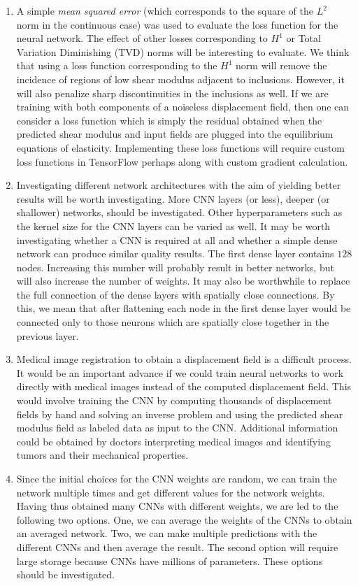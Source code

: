 \documentclass[12pt]{article}
\begin{document}
\begin{enumerate}
\item{A simple \textit{mean squared error} (which corresponds to the square of the $L^2$ norm in the continuous case) was used to evaluate the loss function for the neural network. The effect of other losses corresponding to $H^1$ or Total Variation Diminishing (TVD) norms will be interesting to evaluate. We think that using a loss function corresponding to the $H^1$ norm will remove the incidence of regions of low shear modulus adjacent to inclusions. However, it will also penalize sharp discontinuities in the inclusions as well. If we are training with both components of a noiseless displacement field, then one can consider a loss function which is simply the residual obtained when the predicted shear modulus and input fields are plugged into the equilibrium equations of elasticity. Implementing these loss functions will require custom loss functions in TensorFlow perhaps along with custom gradient calculation.}
\item{Investigating different network architectures with the aim of yielding better results will be worth investigating. More CNN layers (or less), deeper (or shallower) networks, should be investigated. Other hyperparameters such as the kernel size for the CNN layers can be varied as well. It may be worth investigating whether a CNN is required at all and whether a simple dense network can produce similar quality results. The first dense layer contains $128$ nodes. Increasing this number will probably result in better networks, but will also increase the number of weights. It may also be worthwhile to replace the full connection of the dense layers with spatially close connections. By this, we mean that after flattening each node in the first dense layer would be connected only to those neurons which are spatially close together in the previous layer.}
\item{Medical image registration to obtain a displacement field is a difficult process. It would be an important advance if we could train neural networks to work directly with medical images instead of the computed displacement field. This would involve training the CNN by computing thousands of displacement fields by hand and solving an inverse problem and using the predicted shear modulus field as labeled data as input to the CNN. Additional information could be obtained by doctors interpreting medical images and identifying tumors and their mechanical properties.}
\item{Since the initial choices for the CNN weights are random, we can train the network multiple times and get different values for the network weights. Having thus obtained many CNNs with different weights, we are led to the following two options. One, we can average the weights of the CNNs to obtain an averaged network. Two, we can make multiple predictions with the different CNNs and then average the result. The second option will require large storage because CNNs have millions of parameters. These options should be investigated.}

\end{enumerate}
\end{document}
